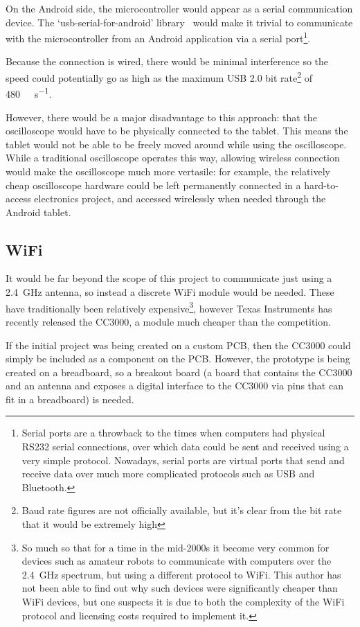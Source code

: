 On the Android side, the microcontroller would appear as a serial communication
device. The `usb-serial-for-android' library~\autocite{AndroidUSBSerial} would
make it trivial to communicate with the microcontroller from an Android
application via a serial port\footnote{Serial ports are a throwback to the times
when computers had physical RS232 serial connections, over which data could be
sent and received using a very simple protocol. Nowadays, serial ports are
virtual ports that send and receive data over much more complicated protocols
such as USB and Bluetooth.}.

Because the connection is wired, there would be minimal interference so the
speed could potentially go as high as the maximum USB 2.0 bit rate\footnote{Baud
rate figures are not officially available, but it's clear from the bit rate that
it would be extremely high} of \SI{480}{\mega\bit\per\second}.

However, there would be a major disadvantage to this approach: that the
oscilloscope would have to be physically connected to the tablet. This means the
tablet would not be able to be freely moved around while using the oscilloscope.
While a traditional oscilloscope operates this way, allowing wireless connection
would make the oscilloscope much more vertasile: for example, the relatively
cheap oscilloscope hardware could be left permanently connected in a
hard-to-access electronics project, and accessed wirelessly when needed through
the Android tablet.

\subsection*{WiFi}

It would be far beyond the scope of this project to communicate just using a
\SI{2.4}{\GHz} antenna, so instead a discrete WiFi module would be needed. These
have traditionally been relatively expensive\footnote{So much so that for a time
in the mid-2000s it become very common for devices such as amateur robots to
communicate with computers over the \SI{2.4}{\GHz} spectrum, but using a
different protocol to WiFi. This author has not been able to find out why such
devices were significantly cheaper than WiFi devices, but one suspects it is due
to both the complexity of the WiFi protocol and licensing costs required to
implement it.}, however Texas Instruments has recently released the CC3000, a
module much cheaper than the competition.~\autocite{CC3000Cheap}

If the initial project was being created on a custom PCB, then the CC3000 could
simply be included as a component on the PCB. However, the prototype is being
created on a breadboard, so a breakout board (a board that contains the CC3000
and an antenna and exposes a digital interface to the CC3000 via pins that can
fit in a breadboard) is needed.

